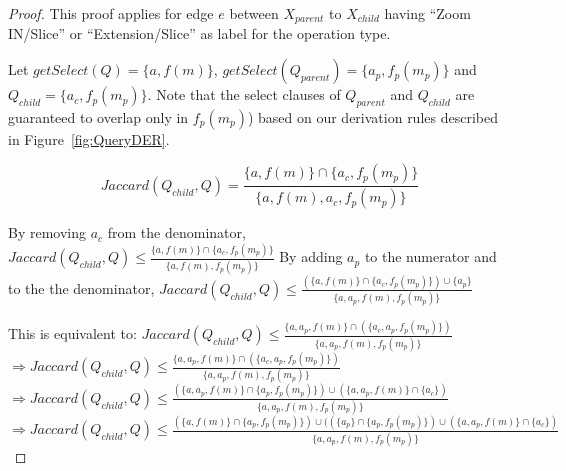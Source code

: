 \begin{proof}
This proof applies for edge $e$ between $X_{parent}$ to $X_{child}$ having ``Zoom IN/Slice'' or ``Extension/Slice''  as label for the operation type. 

Let $getSelect(Q) = \{a, f(m)\}$, $getSelect(Q_{parent}) = \{ a_p, f_p(m_p)\}$ and $Q_{child} = \{a_c, f_p(m_p)\}$. Note that the select clauses of $Q_{parent}$ and $Q_{child}$ are guaranteed to overlap only in $f_p(m_p)$) based on our derivation rules described in Figure~\ref{fig:QueryDER}.

\[Jaccard(Q_{child},Q)=  \frac{  \{a, f(m)\} \cap  \{ a_c, f_p(m_p) \} } {\{ a, f(m), a_c,  f_p(m_p) \}}\]

By removing $a_c$ from the denominator, $ Jaccard(Q_{child},Q) \leq  \frac{  \{a, f(m)\} \cap  \{ a_c, f_p(m_p) \} } {\{ a, f(m),  f_p(m_p) \}}$
By adding $a_p$ to the numerator and to the the denominator,  $ Jaccard(Q_{child},Q) \leq  \frac{ \left( \{a, f(m)\} \cap  \{ a_c, f_p(m_p) \} \right) \cup \{ a_p\} } {\{ a,a_p, f(m),  f_p(m_p) \}}$


This is equivalent to: 
$Jaccard(Q_{child},Q)   \leq    \frac{ \{a, a_p,f(m) \} \cap \left(\{ a_c,a_p, f_p(m_p) \}   \right) }{\{  a,a_p, f(m),  f_p(m_p)  \} }  $\\

$\Rightarrow Jaccard(Q_{child},Q)   \leq    \frac{ \{a, a_p,f(m) \} \cap \left(\{ a_c,a_p, f_p(m_p) \}   \right)  }{\{  a,a_p, f(m),  f_p(m_p)  \} }  $\\

$\Rightarrow Jaccard(Q_{child},Q)   \leq    \frac{\left( \{a, a_p,f(m) \} \cap \{ a_p, f_p(m_p) \}   \right) \cup \left(  \{a, a_p,f(m) \} \cap \{ a_c \}  \right)}{\{  a,a_p, f(m),  f_p(m_p)  \} }  $\\

$\Rightarrow Jaccard(Q_{child},Q)   \leq    \frac{\left( \{a,f(m) \} \cap \{ a_p, f_p(m_p) \}  \right) \cup (\left( \{ a_p\} \cap \{ a_p, f_p(m_p) \}  \right) \cup \left(  \{a, a_p,f(m) \} \cap \{ a_c \}  \right)}{\{  a,a_p, f(m),  f_p(m_p)  \} }  $\\


\end{proof}
